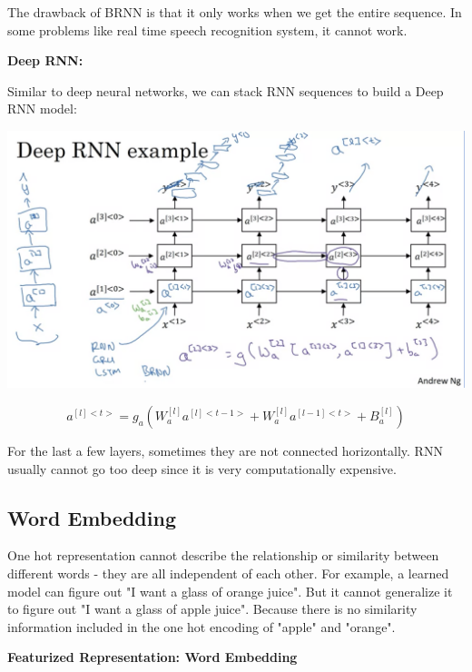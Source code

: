 \documentclass{article}
\begin{document}
\noindent The drawback of BRNN is that it only works when we get the entire sequence. In some problems like real time speech recognition system, it cannot work.

\bigskip

\noindent \textbf{Deep RNN:}

\noindent Similar to deep neural networks, we can stack RNN sequences to build a Deep RNN model:

\begin{center}
\includegraphics[scale=0.3]{./images/deep_rnn.png}
\end{center}

\[a^{[l]<t>} = g_{a}(W_{a}^{[l]} a^{[l]<t - 1>} + W_{a}^{[l]} a^{[l - 1]<t>} + B_{a}^{[l]})\]

\noindent For the last a few layers, sometimes they are not connected horizontally. RNN usually cannot go too deep since it is very computationally expensive.

\subsection{Word Embedding}

\noindent One hot representation cannot describe the relationship or similarity between different words - they are all independent of each other. For example, a learned model can figure out "I want a glass of orange juice". But it cannot generalize it to figure out "I want a glass of apple juice". Because there is no similarity information included in the one hot encoding of "apple" and "orange".

\bigskip

\noindent \textbf{Featurized Representation: Word Embedding}
\end{document}
